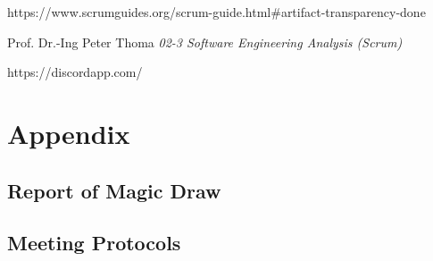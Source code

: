 \documentclass[a4paper, 12pt]{article}
\begin{document}
\newpage    
\begin{thebibliography}{}
https://www.scrumguides.org/scrum-guide.html\#artifact-transparency-done 

 Prof. Dr.-Ing Peter Thoma \emph{02-3 Software Engineering Analysis (Scrum)}
 
 https://discordapp.com/

\end{thebibliography}


\newpage

\section{Appendix}

\subsection{Report of Magic Draw}

\subsection{Meeting Protocols}
\end{document}
